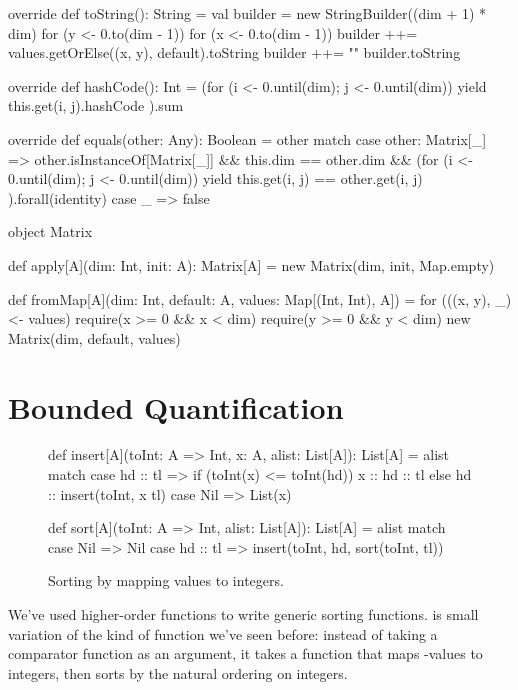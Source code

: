\documentclass[9pt]{extbook}
\begin{document}
\begin{scalacode}
{  override def toString(): String = {
    val builder = new StringBuilder((dim + 1) * dim)
    for (y <- 0.to(dim - 1)) {
      for (x <- 0.to(dim - 1)) {
        builder ++= values.getOrElse((x, y), default).toString
      }
      builder ++= "\n"
    }
    builder.toString
  }

  override def hashCode(): Int = {
    (for (i <- 0.until(dim); j <- 0.until(dim)) yield {
       this.get(i, j).hashCode
     }).sum
  }

  override def equals(other: Any): Boolean = other match {
    case other: Matrix[_] => {
      other.isInstanceOf[Matrix[_]] &&
      this.dim == other.dim &&
      (for (i <- 0.until(dim); j <- 0.until(dim)) yield {
        this.get(i, j) == other.get(i, j)
       }).forall(identity)
    }
    case _ => false
  }

}

object Matrix {

  def apply[A](dim: Int, init: A): Matrix[A] = {
    new Matrix(dim, init, Map.empty)
  }

  def fromMap[A](dim: Int, default: A, values: Map[(Int, Int), A]) = {
    for (((x, y), _) <- values) {
      require(x >= 0 && x < dim)
      require(y >= 0 && y < dim)
    }
    new Matrix(dim, default, values)
  }

}

\end{scalacode}

\newlecture


\section{Bounded Quantification}

\begin{figure}
\begin{scalacode}
def insert[A](toInt: A => Int, x: A, alist: List[A]): List[A] = alist match {
  case hd :: tl => if (toInt(x) <= toInt(hd)) { x :: hd :: tl } else { hd :: insert(toInt, x tl) }
  case Nil => List(x)
}

def sort[A](toInt: A => Int, alist: List[A]): List[A] = alist match {
  case Nil => Nil
  case hd :: tl => insert(toInt, hd, sort(toInt, tl))
}
\end{scalacode}
\caption{Sorting by mapping values to integers.}
\label{sortToIntHOF}
\end{figure}

We've used higher-order functions to write generic sorting functions.
 is small variation of the kind of function we've
seen before: instead of taking a comparator function as an argument, it takes a
 function that maps
-values to integers, then sorts by the natural ordering
on integers.
\end{document}
